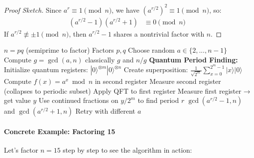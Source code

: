 \documentclass[11pt,a4paper]{article}
\begin{document}
\begin{proof}[Proof Sketch]
Since $a^r \equiv 1 \pmod{n}$, we have $(a^{r/2})^2 \equiv 1 \pmod{n}$, so:
\begin{align}
(a^{r/2} - 1)(a^{r/2} + 1) &\equiv 0 \pmod{n}
\end{align}
If $a^{r/2} \not\equiv \pm 1 \pmod{n}$, then $a^{r/2} - 1$ shares a nontrivial factor with $n$.
\end{proof}

\begin{algorithm}
\caption{Shor's Algorithm for Integer Factorization}
\label{alg:shor}
\begin{algorithmic}[1]
\Require $n = pq$ (semiprime to factor)
\Ensure Factors $p, q$
\State Choose random $a \in \{2, ..., n-1\}$
\State Compute $g = \gcd(a, n)$ classically
    \State \Return $g$ and $n/g$ 
\EndIf
\State \textbf{Quantum Period Finding:}
\State \quad Initialize quantum registers: $|0\rangle^{\otimes m}|0\rangle^{\otimes n}$
\State \quad Create superposition: $\frac{1}{\sqrt{2^m}} \sum_{x=0}^{2^m-1} |x\rangle|0\rangle$
\State \quad Compute $f(x) = a^x \bmod n$ in second register
\State \quad Measure second register (collapses to periodic subset)
\State \quad Apply QFT to first register
\State \quad Measure first register → get value $y$
\State \quad Use continued fractions on $y/2^m$ to find period $r$
    \State \Return $\gcd(a^{r/2} - 1, n)$ and $\gcd(a^{r/2} + 1, n)$
\Else
    \State Retry with different $a$
\EndIf
\end{algorithmic}
\end{algorithm}

\paragraph{Concrete Example: Factoring 15}

Let's factor $n = 15$ step by step to see the algorithm in action:
\end{document}
